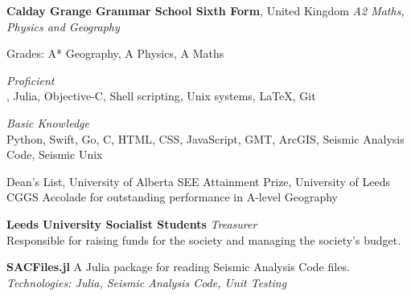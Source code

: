 \documentclass[11pt]{article}
\begin{document}
\medskip
\textbf{Calday Grange Grammar School Sixth Form}, United Kingdom \newline
\emph{A2 Maths, Physics and Geography} 
\begin{itemize*}
\item Grades: A* Geography, A Physics, A Maths
\end{itemize*}

\bigskip

%
\emph{Proficient}\\
\ML, Julia, Objective-C, Shell scripting, Unix systems, \LaTeX, Git

\medskip

\emph{Basic Knowledge}\\
Python, Swift, Go, C, HTML, CSS, JavaScript, GMT, ArcGIS, Seismic Analysis Code,
Seismic Unix

\bigskip

%
Dean's List, University of Alberta  \newline
SEE Attainment Prize, University of Leeds  \newline
CGGS Accolade for outstanding performance in A-level Geography 

\bigskip

%
\textbf{Leeds University Socialist Students}  \newline
\emph{Treasurer}\\
Responsible for raising funds for the society and managing the society's budget.

\bigskip

%
\textbf{SACFiles.jl}  \newline
A Julia package for reading Seismic Analysis Code files. \\
\emph{Technologies: Julia, Seismic Analysis Code, Unit Testing}
\end{document}
